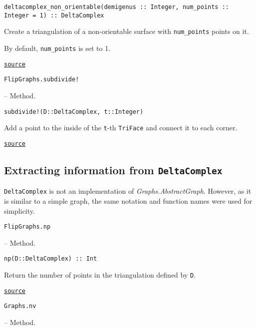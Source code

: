 \begin{adjustwidth}{2em}{0pt}


\begin{verbatim}
deltacomplex_non_orientable(demigenus :: Integer, num_points :: Integer = 1) :: DeltaComplex
\end{verbatim}

Create a triangulation of a non-orientable surface with \texttt{num\_points} points on it. 

By default, \texttt{num\_points} is set to 1.



\href{https://github.com/schto223/FlipGraphs.jl/blob/e35d43698a06b86273148826b79d585ba04fcd26/src/deltaComplex.jl#L615-L621}{\texttt{source}}


\end{adjustwidth}
\hypertarget{3302743078986330830}{\texttt{FlipGraphs.subdivide!}}  -- {Method.}

\begin{adjustwidth}{2em}{0pt}


\begin{verbatim}
subdivide!(D::DeltaComplex, t::Integer)
\end{verbatim}

Add a point to the inside of the \texttt{t}-th \texttt{TriFace} and connect it to each corner.



\href{https://github.com/schto223/FlipGraphs.jl/blob/e35d43698a06b86273148826b79d585ba04fcd26/src/deltaComplex.jl#L757-L761}{\texttt{source}}


\end{adjustwidth}

\subsection{Extracting information from \texttt{DeltaComplex}{\textquotesingle}}



\label{14634587330370490614}{}


\texttt{DeltaComplex} is not an implementation of \emph{Graphs.AbstractGraph}. However, as it is similar to a simple graph, the same notation and function names were used for simplicity.


\hypertarget{6458119118606584173}{\texttt{FlipGraphs.np}}  -- {Method.}

\begin{adjustwidth}{2em}{0pt}


\begin{verbatim}
np(D::DeltaComplex) :: Int
\end{verbatim}

Return the number of points in the triangulation defined by \texttt{D}.



\href{https://github.com/schto223/FlipGraphs.jl/blob/e35d43698a06b86273148826b79d585ba04fcd26/src/deltaComplex.jl#L344-L348}{\texttt{source}}


\end{adjustwidth}
\hypertarget{6570522663719518946}{\texttt{Graphs.nv}}  -- {Method.}

